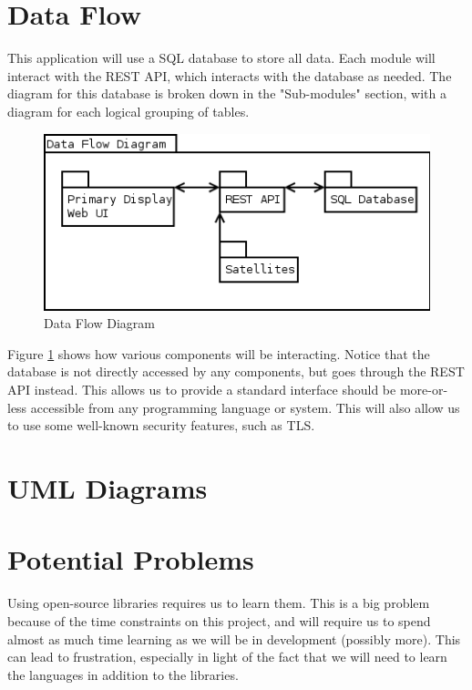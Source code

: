 \section{Data Flow}

This application will use a SQL database to store all data. Each module will interact with the REST API, which interacts with the database as needed. The diagram for this database is broken down in the "Sub-modules" section, with a diagram for each logical grouping of tables.

\begin{figure}
\centering
\includegraphics[scale=0.75]{Software/images/DataFlowDiagram.png}
\caption{Data Flow Diagram}
\label{DataFlowDiagram}
\end{figure}

Figure \ref{DataFlowDiagram} shows how various components will be interacting. Notice that the database is not directly accessed by any components, but goes through the REST API instead. This allows us to provide a standard interface should be more-or-less accessible from any programming language or system. This will also allow us to use some well-known security features, such as TLS.

\section{UML Diagrams}


\section{Potential Problems}

Using open-source libraries requires us to learn them. This is a big problem because of the time constraints on this project, and will require us to spend almost as much time learning as we will be in development (possibly more). This can lead to frustration, especially in light of the fact that we will need to learn the languages in addition to the libraries.


